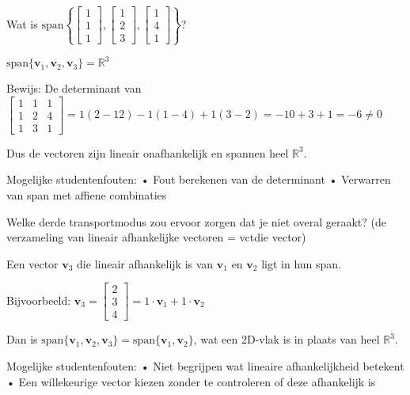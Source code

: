 \documentclass{ximera}
\begin{document}
\begin{question}
Wat is $\text{span}\left\{\begin{bmatrix} 1 \\ 1 \\ 1 \end{bmatrix}, \begin{bmatrix} 1 \\ 2 \\ 3 \end{bmatrix}, \begin{bmatrix} 1 \\ 4 \\ 1 \end{bmatrix}\right\}$?

\begin{freeResponse}
$\text{span}\{\mathbf{v}_1, \mathbf{v}_2, \mathbf{v}_3\} = \mathbb{R}^3$

Bewijs: De determinant van $\begin{bmatrix} 1 & 1 & 1 \\ 1 & 2 & 4 \\ 1 & 3 & 1 \end{bmatrix} = 1(2-12) - 1(1-4) + 1(3-2) = -10 + 3 + 1 = -6 \neq 0$

Dus de vectoren zijn lineair onafhankelijk en spannen heel $\mathbb{R}^3$.

Mogelijke studentenfouten:
• Fout berekenen van de determinant
• Verwarren van span met affiene combinaties
\end{freeResponse}
\end{question}

\begin{question}
Welke derde transportmodus zou ervoor zorgen dat je niet overal geraakt? (de verzameling van lineair afhankelijke vectoren = vct{die vector})

\begin{freeResponse}
Een vector $\mathbf{v}_3$ die lineair afhankelijk is van $\mathbf{v}_1$ en $\mathbf{v}_2$ ligt in hun span.

Bijvoorbeeld: $\mathbf{v}_3 = \begin{bmatrix} 2 \\ 3 \\ 4 \end{bmatrix} = 1 \cdot \mathbf{v}_1 + 1 \cdot \mathbf{v}_2$

Dan is $\text{span}\{\mathbf{v}_1, \mathbf{v}_2, \mathbf{v}_3\} = \text{span}\{\mathbf{v}_1, \mathbf{v}_2\}$, wat een 2D-vlak is in plaats van heel $\mathbb{R}^3$.

Mogelijke studentenfouten:
• Niet begrijpen wat lineaire afhankelijkheid betekent
• Een willekeurige vector kiezen zonder te controleren of deze afhankelijk is
\end{freeResponse}
\end{question}
\end{document}
